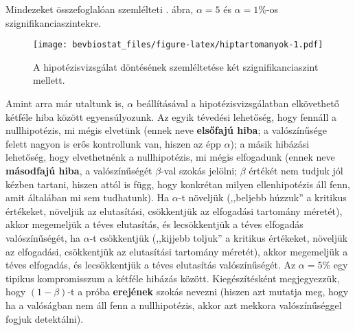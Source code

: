 \documentclass[]{book}
\begin{document}
Mindezeket összefoglalóan szemlélteti . ábra, \(\alpha=5\) és \(\alpha=1\)\%-os szignifikanciaszintekre.

\begin{figure}
\centering
\texttt{[image: bevbiostat\_files/figure-latex/hiptartomanyok-1.pdf]}
\caption{\label{fig:hiptartomanyok}A hipotézisvizsgálat döntésének szemléltetése két szignifikanciaszint mellett.}
\end{figure}

Amint arra már utaltunk is, \(\alpha\) beállításával a hipotézisvizsgálatban elkövethető kétféle hiba között egyensúlyozunk. Az egyik tévedési lehetőség, hogy fennáll a nullhipotézis, mi mégis elvetünk (ennek neve \textbf{elsőfajú hiba}; a valószínűsége felett nagyon is erős kontrollunk van, hiszen az épp \(\alpha\)); a másik hibázási lehetőség, hogy elvethetnénk a nullhipotézis, mi mégis elfogadunk (ennek neve \textbf{másodfajú hiba}, a valószínűségét \(\beta\)-val szokás jelölni; \(\beta\) értékét nem tudjuk jól kézben tartani, hiszen attól is függ, hogy konkrétan milyen ellenhipotézis áll fenn, amit általában mi sem tudhatunk). Ha \(\alpha\)-t növeljük (,,beljebb húzzuk'' a kritikus értékeket, növeljük az elutasítási, csökkentjük az elfogadási tartomány méretét), akkor megemeljük a téves elutasítás, és lecsökkentjük a téves elfogadás valószínűségét, ha \(\alpha\)-t csökkentjük (,,kijjebb toljuk'' a kritikus értékeket, növeljük az elfogadási, csökkentjük az elutasítási tartomány méretét), akkor megemeljük a téves elfogadás, és lecsökkentjük a téves elutasítás valószínűségét. Az \(\alpha=5\)\% egy tipikus kompromisszum a kétféle hibázás között. Kiegészítésként megjegyezzük, hogy \(\left(1-\beta\right)\)-t a próba \textbf{erejének} szokás nevezni (hiszen azt mutatja meg, hogy ha a valóságban nem áll fenn a nullhipotézis, akkor azt mekkora valószínűséggel fogjuk detektálni).
\end{document}
